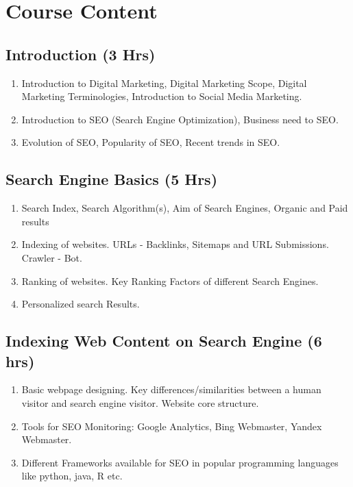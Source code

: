 \section{Course Content}
\noindent
\subsection{Introduction \hfill (3 Hrs)} 

\begin{enumerate}
    \item Introduction to Digital Marketing, Digital Marketing Scope, Digital Marketing Terminologies, Introduction to Social Media Marketing.
    \item Introduction to SEO (Search Engine Optimization), Business need to SEO.
    \item Evolution of SEO, Popularity of SEO, Recent trends in SEO.
\end{enumerate}

\subsection{Search Engine Basics \hfill (5 Hrs)} 

\begin{enumerate}
    \item Search Index, Search Algorithm(s), Aim of Search Engines, Organic and Paid results
    \item Indexing of websites. URLs - Backlinks, Sitemaps and URL Submissions. Crawler - Bot. 
    \item Ranking of websites. Key Ranking Factors of different Search Engines.
    \item Personalized search Results.
    
\end{enumerate}

\subsection{Indexing Web Content on Search Engine \hfill (6 hrs)} 

\begin{enumerate}
    \item Basic webpage designing. Key differences/similarities between a human visitor and search engine visitor. Website core structure.
    \item Tools for SEO Monitoring: Google Analytics, Bing Webmaster, Yandex Webmaster. 
    \item Different Frameworks available for SEO in popular programming languages like python, java, R etc.
    
\end{enumerate}

